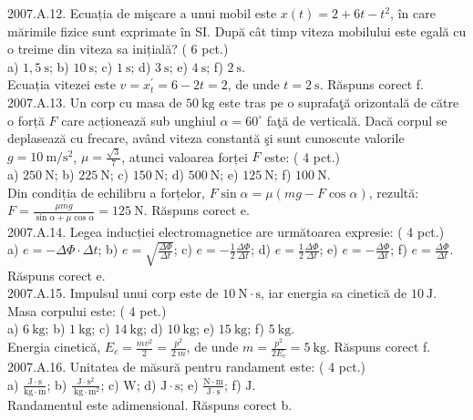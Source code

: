2007.A.12. Ecuația de mişcare a unui mobil este $x(t)=2+6 t-t^{2}$, în care mărimile fizice sunt exprimate în SI. După cât timp viteza mobilului este egală cu o treime din viteza sa inițială? ( 6 pct.)\\ a) $1,5 \mathrm{~s}$; b) $10 \mathrm{~s}$; c) $1 \mathrm{~s}$; d) $3 \mathrm{~s}$; e) $4 \mathrm{~s}$; f) $2 \mathrm{~s}$.\\ Ecuația vitezei este $v=x_{t}^{\prime}=6-2 t=2$, de unde $t=2 \mathrm{~s}$. Răspuns corect f.\\

2007.A.13. Un corp cu masa de $50 \mathrm{~kg}$ este tras pe o suprafaţă orizontală de către o forță $F$ care acționează sub unghiul $\alpha=60^{\circ}$ faţă de verticală. Dacă corpul se deplasează cu frecare, având viteza constantă şi sunt cunoscute valorile $g=10 \mathrm{~m} / \mathrm{s}^{2}$, $\mu=\frac{\sqrt{3}}{7}$, atunci valoarea forței $F$ este: ( 4 pct.)\\ a) $250 \mathrm{~N}$; b) $225 \mathrm{~N}$; c) $150 \mathrm{~N}$; d) $500 \mathrm{~N}$; e) $125 \mathrm{~N}$; f) $100 \mathrm{~N}$.\\ Din condiția de echilibru a forțelor, $F \sin \alpha=\mu(m g-F \cos \alpha)$, rezultă:\\ $F=\frac{\mu m g}{\sin \alpha+\mu \cos \alpha}=125 \mathrm{~N}$. Răspuns corect e.\\

2007.A.14. Legea inducției electromagnetice are următoarea expresie: ( 4 pct.)\\ a) $e=-\Delta \Phi \cdot \Delta t$; b) $e=\sqrt{\frac{\Delta \Phi}{\Delta t}}$; c) $e=-\frac{1}{2} \frac{\Delta \Phi}{\Delta t}$; d) $e=\frac{1}{2} \frac{\Delta \Phi}{\Delta t}$; e) $e=-\frac{\Delta \Phi}{\Delta t}$; f) $e=\frac{\Delta \Phi}{\Delta t}$.\\ Răspuns corect e.\\

2007.A.15. Impulsul unui corp este de $10 \mathrm{~N} \cdot \mathrm{s}$, iar energia sa cinetică de $10 \mathrm{~J}$. Masa corpului este: ( 4 pet.)\\ a) $6 \mathrm{~kg}$; b) $1 \mathrm{~kg}$; c) $14 \mathrm{~kg}$; d) $10 \mathrm{~kg}$; e) $15 \mathrm{~kg}$; f) $5 \mathrm{~kg}$.\\ Energia cinetică, $E_{c}=\frac{m v^{2}}{2}=\frac{p^{2}}{2 ~m}$, de unde $m=\frac{p^{2}}{2 E_{c}}=5 \mathrm{~kg}$. Răspuns corect f.\\

2007.A.16. Unitatea de măsură pentru randament este: ( 4 pct.)\\ a) $\frac{\mathrm{J} \cdot \mathrm{s}}{\mathrm{kg} \cdot \mathrm{m}}$; b) $\frac{\mathrm{J} \cdot \mathrm{s}^{2}}{\mathrm{~kg} \cdot \mathrm{m}^{2}}$; c) $\mathrm{W}$; d) $\mathrm{J} \cdot \mathrm{s}$; e) $\frac{\mathrm{N} \cdot \mathrm{m}}{\mathrm{J} \cdot \mathrm{s}}$; f) $\mathrm{J}$.\\ Randamentul este adimensional. Răspuns corect b.\\

